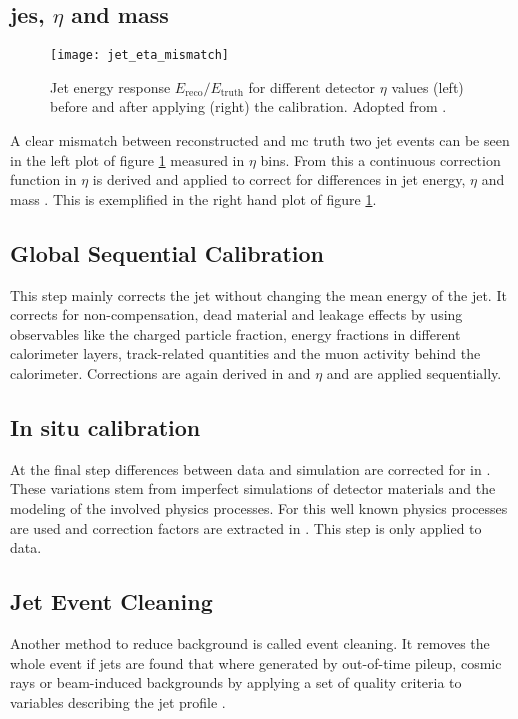 \subsection{\ac{jes}, $\eta$ and mass}
\begin{figure}
  \centering
  \texttt{[image: jet\_eta\_mismatch]}
  \caption[]{Jet energy response $E_\text{reco}/E_\text{truth}$ for different detector $\eta$ values (left) before and after applying (right) the calibration. Adopted from \citep{jet_eta_calib}.}
  \label{fig:jet_eta_mismatch}
\end{figure}
A clear mismatch between reconstructed and \ac{mc} truth two jet events can be seen in the left plot of figure \ref{fig:jet_eta_mismatch} measured in $\eta$ bins. From this a continuous correction function in $\eta$ is derived and applied to correct for differences in jet energy, $\eta$ and mass \citep{atlas2011jet,Aaboud:2019aa}. This is exemplified in the right hand plot of figure \ref{fig:jet_eta_mismatch}.

\subsection{Global Sequential Calibration}
This step mainly corrects the jet \pt without changing the mean energy of the jet. It corrects for non-compensation, dead material and leakage effects by using observables like the charged particle fraction, energy fractions in different calorimeter layers, track-related quantities and the muon activity behind the calorimeter. Corrections are again derived in \pt and $\eta$ and are applied sequentially.

\subsection{In situ calibration}
At the final step differences between data and simulation are corrected for in \pt. These variations stem from imperfect simulations of detector materials and the modeling of the involved physics processes. For this well known physics processes are used and correction factors are extracted in \pt. This step is only applied to data.

\subsection{Jet Event Cleaning}
Another method to reduce background is called event cleaning. It removes the whole event if jets are found that where generated by out-of-time pileup, cosmic rays or beam-induced backgrounds by applying a set of quality criteria to variables describing the jet profile \citep{ATLAS-CONF-2015-029}.

